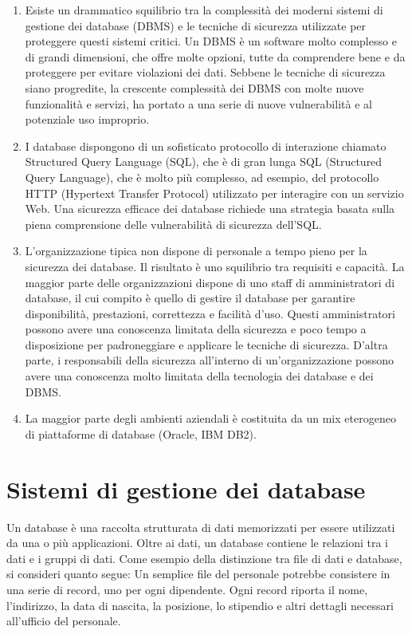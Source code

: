 \begin{enumerate}

    \item Esiste un drammatico squilibrio tra la complessità dei moderni sistemi di gestione dei database (DBMS) e le tecniche di sicurezza utilizzate per proteggere questi sistemi critici. Un DBMS è un software molto complesso e di grandi dimensioni, che offre molte opzioni, tutte da comprendere bene e da proteggere per evitare violazioni dei dati. Sebbene le tecniche di sicurezza siano progredite, la crescente complessità dei DBMS con molte nuove funzionalità e servizi, ha portato a una serie di nuove vulnerabilità e al potenziale uso improprio.
    
    \item I database dispongono di un sofisticato protocollo di interazione chiamato Structured Query Language (SQL), che è di gran lunga SQL (Structured Query Language), che è molto più complesso, ad esempio, del protocollo HTTP (Hypertext Transfer Protocol) utilizzato per interagire con un servizio Web. Una sicurezza efficace dei database richiede una strategia basata sulla piena comprensione delle vulnerabilità di sicurezza dell'SQL.
    
    \item L'organizzazione tipica non dispone di personale a tempo pieno per la sicurezza dei database. Il risultato è uno squilibrio tra requisiti e capacità. La maggior parte delle organizzazioni dispone di uno staff di amministratori di database, il cui compito è quello di gestire il database per garantire disponibilità, prestazioni, correttezza e facilità d'uso. Questi amministratori possono avere una conoscenza limitata della sicurezza e poco tempo a disposizione per padroneggiare e applicare le tecniche di sicurezza. D'altra parte, i responsabili della sicurezza all'interno di un'organizzazione possono avere una conoscenza molto limitata della tecnologia dei database e dei DBMS.
    
    \item La maggior parte degli ambienti aziendali è costituita da un mix eterogeneo di piattaforme di database (Oracle, IBM DB2).
\end{enumerate}
\section{Sistemi di gestione dei database}
Un database è una raccolta strutturata di dati memorizzati per essere utilizzati da una o più applicazioni. Oltre ai dati, un database contiene le relazioni tra i dati e i gruppi di dati. Come esempio della distinzione tra file di dati e database, si consideri quanto segue: Un semplice file del personale potrebbe consistere in una serie di record, uno per ogni dipendente. Ogni record riporta il nome, l'indirizzo, la data di nascita, la posizione, lo stipendio e altri dettagli necessari all'ufficio del personale.

